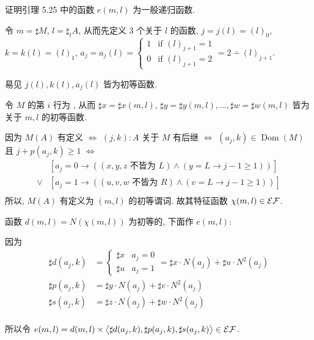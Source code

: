 \begin{problem}
证明引理 5.25 中的函数 $e(m,l)$ 为一般递归函数.
\end{problem}

\begin{solution}
令 $m = \sharp M$, $l = \sharp_t A$, 从而先定义 3 个关于 $l$ 的函数, $j=j(l)=(l)_0$, $k=k(l)=(l)_1$, $a_j = a_j(l) = \begin{cases}1 & \text{if } (l)_{j+1} = 1 \\ 0 & \text{if } (l)_{j+1} = 2\end{cases} = 2 \dotminus (l)_{j+1}$.

易见 $j(l), k(l), a_j(l)$ 皆为初等函数.

令 $M$ 的第 $i$ 行为 , 从而 $\sharp x = \sharp x(m,l)$, $\sharp y = \sharp y(m,l), \dots, \sharp w = \sharp w(m,l)$ 皆为关于 $m,l$ 的初等函数.

因为 $M(A)$ 有定义 $\Leftrightarrow$ $(j,k) : A$ 关于 $M$ 有后继 $\Leftrightarrow$ $(a_j,k) \in \operatorname{Dom}(M)$ 且 $j+p(a_j,k) \ge 1$ $\Leftrightarrow$ \begin{align*}
     & [a_j = 0 \to ((x,y,z \text{ 不皆为 } L) \land (y = L \to j - 1 \ge 1))] \\
\lor & [a_j = 1 \to ((u,v,w \text{ 不皆为 } R) \land (v = L \to j - 1 \ge 1))] \\
\end{align*}
所以, $M(A)$ 有定义为 $(m,l)$ 的初等谓词. 故其特征函数 $\chi(m,l) \in \mathcal{EF}$.

函数 $d(m,l) = N(\chi(m,l))$ 为初等的, 下面作 $e(m,l)$:

因为 \begin{align*}
\sharp d(a_j,k) & = \begin{cases}\sharp x & a_j = 0 \\ \sharp u & a_j = 1 \end{cases} = \sharp x \cdot N(a_j) + \sharp u \cdot N^2(a_j) \\ 
\sharp p(a_j,k) & = \sharp y \cdot N(a_j) + \sharp v \cdot N^2(a_j) \\
\sharp s(a_j,k) & = \sharp z \cdot N(a_j) + \sharp w \cdot N^2(a_j) \\
\end{align*}

所以令 $e(m,l) = d(m,l) \times \left \langle \sharp d(a_j,k), \sharp p(a_j,k), \sharp s(a_j, k) \right \rangle \in \mathcal{EF}$.
\end{solution}
